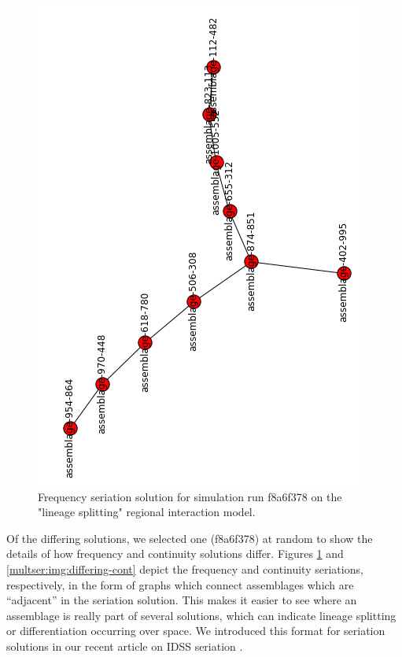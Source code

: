 \begin{figure}[ht]
\centering
\includegraphics[scale=0.4,angle=270]{graphics/multipleseriation/f8a6f378-freq.png}
\caption{Frequency seriation solution for simulation run f8a6f378 on the "lineage splitting" regional interaction model.}
\label{multser:img:differing-freq}
\end{figure}

Of the differing solutions, we selected one (f8a6f378) at random to show
the details of how frequency and continuity solutions differ. Figures
\ref{multser:img:differing-freq} and \ref{multser:img:differing-cont} depict the
frequency and continuity seriations, respectively, in the form of graphs
which connect assemblages which are ``adjacent'' in the seriation
solution. This makes it easier to see where an assemblage is really part
of several solutions, which can indicate lineage splitting or
differentiation occurring over space. We introduced this format for
seriation solutions in our recent article on IDSS seriation
\citep{Lipo2015}.

